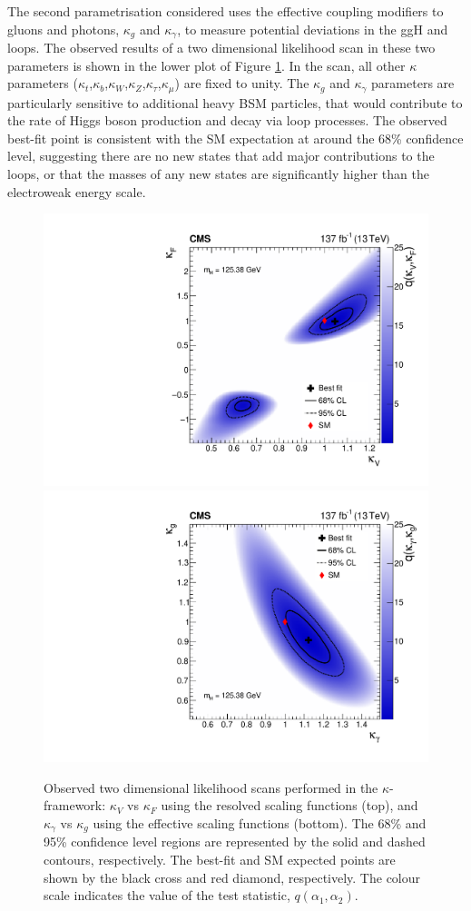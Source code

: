 The second parametrisation considered uses the effective coupling modifiers to gluons and photons, $\kappa_g$ and $\kappa_\gamma$, to measure potential deviations in the ggH and \Hgg loops. The observed results of a two dimensional likelihood scan in these two parameters is shown in the lower plot of Figure \ref{fig:2d_kappa}. In the scan, all other $\kappa$ parameters ($\kappa_t$,$\kappa_b$,$\kappa_W$,$\kappa_Z$,$\kappa_\tau$,$\kappa_\mu$) are fixed to unity. The $\kappa_g$ and $\kappa_\gamma$ parameters are particularly sensitive to additional heavy BSM particles, that would contribute to the rate of Higgs boson production and decay via loop processes. The observed best-fit point is consistent with the SM expectation at around the 68\% confidence level, suggesting there are no new states that add major contributions to the loops, or that the masses of any new states are significantly higher than the electroweak energy scale.

\begin{figure}[htbp]
  \centering
  \includegraphics[width=.65\textwidth]{Figures/hgg_results/scan2D_kappa_V_vs_kappa_F_obs.pdf}
  \includegraphics[width=.65\textwidth]{Figures/hgg_results/scan2D_kappa_gam_vs_kappa_g_obs.pdf}
  \caption[Two dimensional likelihood scans in the coupling modifier parametrisation]
  {
    Observed two dimensional likelihood scans performed in the $\kappa$-framework: $\kappa_V$ vs $\kappa_F$ using the resolved scaling functions (top), and $\kappa_\gamma$ vs $\kappa_g$ using the effective scaling functions (bottom). The 68\% and 95\% confidence level regions are represented by the solid and dashed contours, respectively. The best-fit and SM expected points are shown by the black cross and red diamond, respectively. The colour scale indicates the value of the test statistic, $q(\alpha_1,\alpha_2)$.
  }
  \label{fig:2d_kappa}
\end{figure}

